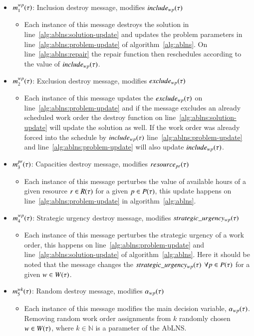\begin{itemize}
	\item $m^{wp}_{1}(\tau)$: Inclusion destroy message, modifies $include_{wp}(\tau)$	
	\begin{itemize}
		\item Each instance of this message destroys the solution in line~\ref{alg:ablns:solution-update} 
			and updates the problem parameters in line~\ref{alg:ablns:problem-update} of algorithm~\ref{alg:ablns}.
			On line~\ref{alg:ablns:repair} the repair function then reschedules according to the value of $include_{wp}(\tau)$.
	\end{itemize}
	\item $m^{wp}_{2}(\tau)$: Exclusion destroy message, modifies $exclude_{wp}(\tau)$
	\begin{itemize}
		\item Each instance of this message updates the $exclude_{wp}(\tau)$ on line~\ref{alg:ablns:problem-update}
			and if the message excludes an already scheduled work order the destroy function on line~\ref{alg:ablns:solution-update}
			will update the solution as well. If the work order was already forced into the schedule by $include_{wp}(\tau)$ line~\ref{alg:ablns:problem-update}
			and line~\ref{alg:ablns:problem-update} will also update $include_{wp}(\tau)$.
	\end{itemize}
	\item $m^{pr}_{3}(\tau)$: Capacities destroy message, modifies $\ParStrategicResource$
	\begin{itemize}
		\item Each instance of this message perturbes the value of available hours of a given resource $r \in R(\tau)$ for
			a given $p \in P(\tau)$, this update happens on line~\ref{alg:ablns:problem-update} in algorithm~\ref{alg:ablns}.
	\end{itemize}
	\item $m^{wp}_{4}(\tau)$: Strategic urgency destroy message, modifies $strategic\_urgency_{w p}(\tau)$
	\begin{itemize}
		\item Each instance of this message perturbes the strategic urgency of a work order, this happens on line~\ref{alg:ablns:problem-update} and
		line~\ref{alg:ablns:solution-update} of algorithm~\ref{alg:ablns}. Here it should be noted that the
			message changes the $strategic\_urgency_{w p}(\tau)$ $\forall p \in P(\tau)$ for a given $\ElementWorkOrder \in \SetWorkOrder$. 
	\end{itemize}
	\item $m^{wk}_{5}(\tau)$: Random destroy message, modifies $\alpha_{wp}(\tau)$
	\begin{itemize}
		\item Each instance of this message modifies the main decision variable, $\alpha_{wp}(\tau)$. 
			Removing random work order assignments from $k$ randomly chosen $\ElementWorkOrder \in \SetWorkOrder$, where $k\in\mathbb{N}$ is a parameter of the AbLNS.
	\end{itemize}
\end{itemize}

